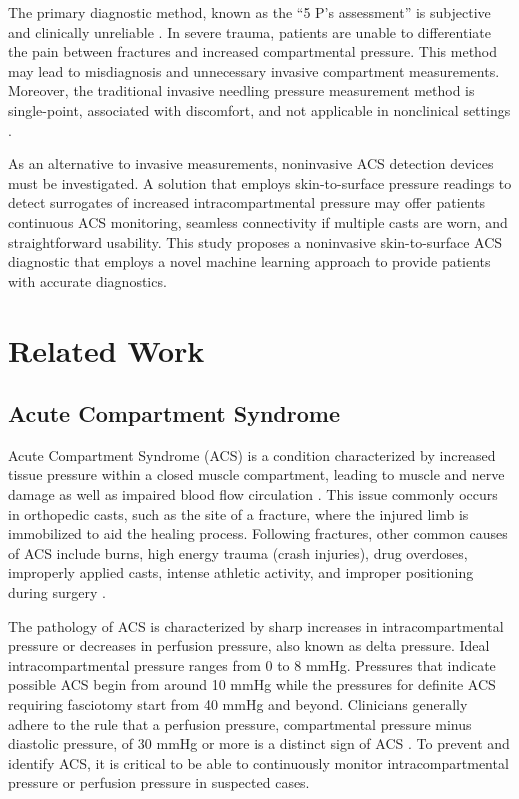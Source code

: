 \documentclass[times, twoside]{zHenriquesLab-StyleBioRxiv}
\begin{document}
The primary diagnostic method, known as the “5 P’s assessment” is subjective and clinically unreliable \cite{guo2019acute}. In severe trauma, patients are unable to differentiate the pain between fractures and increased compartmental pressure. This method may lead to misdiagnosis and unnecessary invasive compartment measurements. Moreover, the traditional invasive needling pressure measurement method is single-point, associated with discomfort, and not applicable in nonclinical settings \cite{li2019novel}.

As an alternative to invasive measurements, noninvasive ACS detection devices must be investigated. A solution that employs skin-to-surface pressure readings to detect surrogates of increased intracompartmental pressure may offer patients continuous ACS monitoring, seamless connectivity if multiple casts are worn, and straightforward usability. This study proposes a noninvasive skin-to-surface ACS diagnostic that employs a novel machine learning approach to provide patients with accurate diagnostics.

\section*{Related Work}
\subsection*{Acute Compartment Syndrome}
Acute Compartment Syndrome (ACS) is a condition characterized by increased tissue pressure within a closed muscle compartment, leading to muscle and nerve damage as well as impaired blood flow circulation \cite{pennmedicine2023}. This issue commonly occurs in orthopedic casts, such as the site of a fracture, where the injured limb is immobilized to aid the healing process. Following fractures, other common causes of ACS include burns, high energy trauma (crash injuries), drug overdoses, improperly applied casts, intense athletic activity, and improper positioning during surgery \cite{torlincasi2023acute}. 

The pathology of ACS is characterized by sharp increases in intracompartmental pressure or decreases in perfusion pressure, also known as delta pressure. Ideal intracompartmental pressure ranges from 0 to 8 mmHg. Pressures that indicate possible ACS begin from around 10 mmHg while the pressures for definite ACS requiring fasciotomy start from 40 mmHg and beyond. Clinicians generally adhere to the rule that a perfusion pressure, compartmental pressure minus diastolic pressure, of 30 mmHg or more is a distinct sign of ACS \cite{klenerman2007evolution}. To prevent and identify ACS, it is critical to be able to continuously monitor intracompartmental pressure or perfusion pressure in suspected cases.
\end{document}
